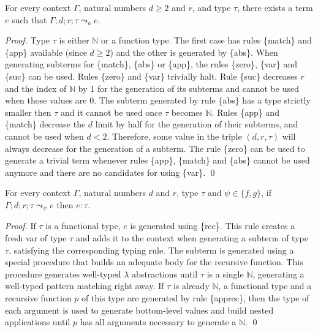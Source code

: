 \documentclass[runningheads]{llncs}
\newcommand{\tN}{\mathbb{N}}
\begin{document}
\begin{lemma}
  For every context $\Gamma$, natural numbers $d \geq 2$ and $r$, and type $\tau$, there exists a term $e$ such that ${\Gamma; d; r; \tau \leadsto_a e}$.
\end{lemma}
\begin{proof}
  Type $\tau$ is either $\tN$ or a function type. The first case has rules \{match\} and \{app\} available (since $d \geq 2$) and the other is generated by \{abs\}. When generating subterms for \{match\}, \{abs\} or \{app\}, the rules \{zero\}, \{var\} and \{suc\} can be used. Rules \{zero\} and \{var\} trivially halt. Rule \{suc\} decreases $r$ and the index of $\tN$ by 1 for the generation of its subterms and cannot be used when those values are 0. The subterm generated by rule \{abs\} has a type strictly smaller then $\tau$ and it cannot be used once $\tau$ becomes $\tN$. Rules \{app\} and \{match\} decrease the $d$ limit by half for the generation of their subterms, and cannot be used when $d < 2$. Therefore, some value in the triple $(d, r, \tau)$ will always decrease for the generation of a subterm. The rule \{zero\} can be used to generate a trivial term whenever rules \{app\}, \{match\} and \{abs\} cannot be used anymore and there are no candidates for using \{var\}. \qed
\end{proof}

\begin{theorem}
  For every context $\Gamma$, natural numbers $d$ and $r$, type $\tau$ and ${\psi \in \{f, g\}}$, if ${\Gamma; d; r; \tau \leadsto_\psi e}$ then $e : \tau$.
\end{theorem}
\begin{proof}
If $\tau$ is a functional type, $e$ is generated using \{rec\}.
This rule creates a fresh var of type $\tau$ and adds it to the 
context when generating a subterm of type $\tau$, satisfying the 
corresponding typing rule. The subterm is generated using a special 
procedure that builds an adequate body for the recursive function. 
This procedure generates well-typed $\lambda$ abstractions until 
$\tau$ is a single $\tN$, generating a well-typed pattern matching right away.
If $\tau$ is already $\tN$, a functional type and a recursive 
function $p$ of this type are generated by rule \{apprec\}, 
then the type of each 
argument is used to generate bottom-level values 
and build nested applications 
until $p$ has all arguments necessary to generate a $\tN$. \qed
\end{proof}
\end{document}

